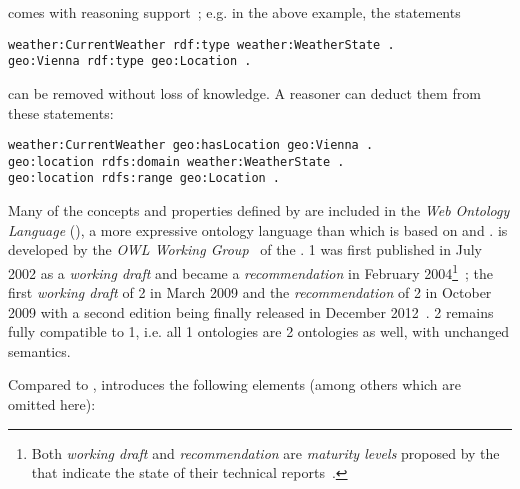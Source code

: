  comes with reasoning support~\cite{RDF_semantics}; e.g. in the above example, the statements

\begin{lstlisting}
weather:CurrentWeather rdf:type weather:WeatherState .
geo:Vienna rdf:type geo:Location .
\end{lstlisting}

can be removed without loss of knowledge. A reasoner can deduct them from these statements:

\begin{lstlisting}
weather:CurrentWeather geo:hasLocation geo:Vienna .
geo:location rdfs:domain weather:WeatherState .
geo:location rdfs:range geo:Location .
\end{lstlisting}

\vspace{1em}

Many of the concepts and properties defined by  are included in the \emph{Web Ontology Language} (), a more expressive ontology language than  which is based on  and .  is developed by the \emph{OWL Working Group}~\cite{OWL-working-group} of the .  1 was first published in July 2002 as a \emph{working draft} and became a  \emph{recommendation} in February 2004\footnote{Both \emph{working draft} and \emph{recommendation} are \emph{maturity levels} proposed by the  that indicate the state of their technical reports~\cite{w3c-process}.}~\cite{OWL1}; the first \emph{working draft} of  2 in March 2009 and the  \emph{recommendation} of  2 in October 2009 with a second edition being finally released in December 2012~\cite{OWL}.
 2 remains fully compatible to  1, i.e. all  1 ontologies are  2 ontologies as well, with unchanged semantics.

Compared to ,  introduces the following elements (among others which are omitted here):

